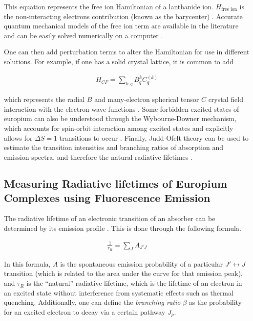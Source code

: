 This equation represents the free ion Hamiltonian of a lanthanide ion.
$H_{\text{free ion}}$ is the non-interacting electrons contribution (known as
the barycenter) \cite{Peijzel:2005jh}. Accurate quantum mechanical models of
the free ion term are available in the literature and can be easily solved
numerically on a computer \cite{Carnall:1989fc,Morrison:1988tw}.

One can then add perturbation terms to alter the Hamiltonian for use in
different solutions. For example, if one has a solid crystal lattice, it is
common to add

\begin{align*}
  H_{CF} = \sum_{k,q} B_q^k C_q^{(k)}
\end{align*}

which represents the radial $B$ and many-electron spherical tensor $C$ crystal
field interaction with the electron wave functions \cite{Peijzel:2005jh}.  Some
forbidden excited states of europium can also be understood through the
Wybourne-Downer mechanism, which accounts for spin-orbit interaction among
excited states and explicitly allows for $\Delta S = 1$ transitions to occur
\cite{Wybourne:1968ez,Downer:1988kz}.  Finally, Judd-Ofelt theory can be used
to estimate the transition intensities and branching ratios of absorption and
emission spectra, and therefore the natural radiative lifetimes
\cite{Werts:2002fs}.



\subsection{Measuring Radiative lifetimes of Europium Complexes using Fluorescence Emission}\label{subsec:rad_life}

The radiative lifetime of an electronic transition of an absorber can be
determined by its emission profile \cite{Werts:2002fs}. This is done through
the following formula.

\begin{align}
  \frac{1}{\tau_R} = \sum_JA_{J'J}\label{eq:nat_life_emiss}
\end{align}

In this formula, $A$ is the spontaneous emission probability of a particular
$J' \leftrightarrow J$ transition (which is related to the area under the curve for that
emission peak), and $\tau_R$ is the ``natural'' radiative lifetime, which is
the lifetime of an electron in an excited state without interference from
systematic effects such as thermal quenching. Additionally, one can define the
\emph{branching ratio} $\beta$ as the probability for an excited electron to
decay via a certain pathway $J_p$.

